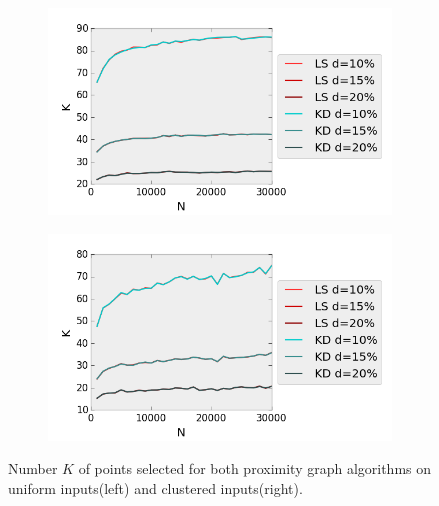 \begin{figure}[H] 
  \begin{subfigure}[b]{0.5\linewidth}
    \centering
    \includegraphics[width=0.9\linewidth]{Pictures/unif_kd_ls_k} 
    \label{fig:unif_kd_ls_k} 
    \vspace{4ex}
  \end{subfigure}%
  \begin{subfigure}[b]{0.5\linewidth}
    \centering
    \includegraphics[width=0.9\linewidth]{Pictures/clus_kd_ls_k} 
    \label{fig:clus_kd_ls_k} 
    \vspace{4ex}
  \end{subfigure}
  \caption[Number $K$ of points selected for Line Sweep and $k$-d Tree range search]{Number $K$ of points selected for both proximity graph algorithms on uniform inputs(left) and clustered inputs(right).}
  \label{fig:kd_ls_k} 
\end{figure}

